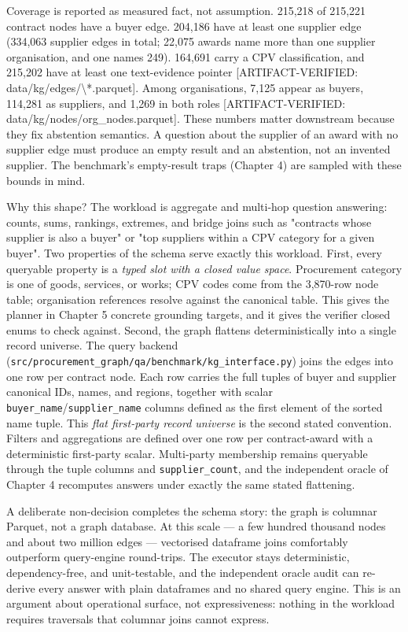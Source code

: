 \documentclass[10pt]{article} %
\begin{document}
Coverage is reported as measured fact, not assumption. 215,218 of 215,221 contract nodes have a buyer edge. 204,186 have at least one supplier edge (334,063 supplier edges in total; 22,075 awards name more than one supplier organisation, and one names 249). 164,691 carry a CPV classification, and 215,202 have at least one text-evidence pointer [ARTIFACT-VERIFIED: data/kg/edges/\textbackslash{}*.parquet]. Among organisations, 7,125 appear as buyers, 114,281 as suppliers, and 1,269 in both roles [ARTIFACT-VERIFIED: data/kg/nodes/org\_nodes.parquet]. These numbers matter downstream because they fix abstention semantics. A question about the supplier of an award with no supplier edge must produce an empty result and an abstention, not an invented supplier. The benchmark's empty-result traps (Chapter 4) are sampled with these bounds in mind.

Why this shape? The workload is aggregate and multi-hop question answering: counts, sums, rankings, extremes, and bridge joins such as "contracts whose supplier is also a buyer" or "top suppliers within a CPV category for a given buyer". Two properties of the schema serve exactly this workload. First, every queryable property is a \emph{typed slot with a closed value space}. Procurement category is one of goods, services, or works; CPV codes come from the 3,870-row node table; organisation references resolve against the canonical table. This gives the planner in Chapter 5 concrete grounding targets, and it gives the verifier closed enums to check against. Second, the graph flattens deterministically into a single record universe. The query backend (\texttt{src/procurement\_graph/qa/benchmark/kg\_interface.py}) joins the edges into one row per contract node. Each row carries the full tuples of buyer and supplier canonical IDs, names, and regions, together with scalar \texttt{buyer\_name}/\texttt{supplier\_name} columns defined as the first element of the sorted name tuple. This \emph{flat first-party record universe} is the second stated convention. Filters and aggregations are defined over one row per contract-award with a deterministic first-party scalar. Multi-party membership remains queryable through the tuple columns and \texttt{supplier\_count}, and the independent oracle of Chapter 4 recomputes answers under exactly the same stated flattening.

A deliberate non-decision completes the schema story: the graph is columnar Parquet, not a graph database. At this scale --- a few hundred thousand nodes and about two million edges --- vectorised dataframe joins comfortably outperform query-engine round-trips. The executor stays deterministic, dependency-free, and unit-testable, and the independent oracle audit can re-derive every answer with plain dataframes and no shared query engine. This is an argument about operational surface, not expressiveness: nothing in the workload requires traversals that columnar joins cannot express.
\end{document}
